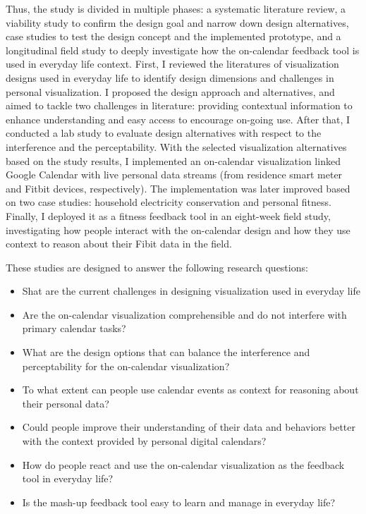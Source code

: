 \documentclass[12pt,oneside]{book}
\begin{document}
Thus, the study is divided in multiple phases: a systematic literature review, a viability study to confirm the design goal and narrow down design alternatives, case studies to test the design concept and the implemented prototype, and a longitudinal field study to deeply investigate how the on-calendar feedback tool is used in everyday life context.  First, I reviewed the literatures of visualization designs used in everyday life to identify design dimensions and challenges in personal visualization.  I proposed the design approach and alternatives, and aimed to tackle two challenges in literature: providing contextual information to enhance understanding and easy access to encourage on-going use.
After that, I conducted a lab study to evaluate design alternatives with respect to the interference and the perceptability.  With the selected visualization alternatives based on the study results, I implemented an on-calendar visualization linked Google Calendar with live personal data streams (from residence smart meter and Fitbit devices, respectively). The implementation was later improved based on two case studies: household electricity conservation and personal fitness. Finally, I deployed it as a fitness feedback tool in an eight-week field study, investigating how people interact with the on-calendar design and how they use context to reason about their Fibit data in the field. 

These studies are designed to answer the following research questions:
\begin{itemize}
	\item{Shat are the current challenges in designing visualization used in everyday life}
	\item{Are the on-calendar visualization comprehensible and do not interfere with primary calendar tasks?}
	\item{What are the design options that can balance the interference and perceptability for the on-calendar visualization?}
	\item{To what extent can people use calendar events as context for reasoning about their personal data?}
	\item{Could people improve their understanding of their data and behaviors better with the context provided by personal digital calendars?}
	\item{How do people react and use the on-calendar visualization as the feedback tool in everyday life?}
	\item{Is the mash-up feedback tool easy to learn and manage in everyday life?}
\end{itemize}
\end{document}
